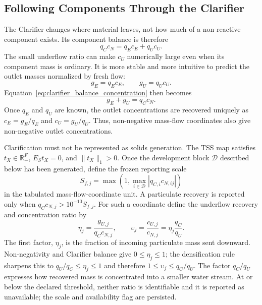 \documentclass[a4paper,fleqn]{cas-sc}
\newcommand{\R}{\mathbb{R}}
\begin{document}
\subsection{Following Components Through the Clarifier}

The Clarifier changes where material leaves, not how much of a non-reactive component exists. Its component balance is therefore
\begin{equation}
\label{eq:clarifier_balance_concentration}
q_Cc_N=q_Ec_E+q_Uc_U.
\end{equation}
The small underflow ratio can make $c_U$ numerically large even when its component mass is ordinary. It is more stable and more intuitive to predict the outlet masses normalized by fresh flow:
\begin{equation}
\label{eq:clarifier_mass_flow_coordinates}
g_E=q_Ec_E,\qquad g_U=q_Uc_U.
\end{equation}
Equation~\eqref{eq:clarifier_balance_concentration} then becomes
\begin{equation}
\label{eq:clarifier_balance}
g_E+g_U=q_Cc_N.
\end{equation}
Once $q_E$ and $q_U$ are known, the outlet concentrations are recovered uniquely as $c_E=g_E/q_E$ and $c_U=g_U/q_U$. Thus, non-negative mass-flow coordinates also give non-negative outlet concentrations.

Clarification must not be represented as solids generation. The TSS map satisfies $t_X\in\R_+^F$, $E_St_X=0$, and $\|t_X\|_1>0$. Once the development block $\mathcal D$ described below has been generated, define the frozen reporting scale
\begin{equation}
S_{f,j}=\max\!\left(1,\max_{i\in\mathcal D}|q_{C,i}c_{N,ij}|\right)
\end{equation}
in the tabulated mass-flow-coordinate unit. A particulate recovery is reported only when $q_Cc_{N,j}>10^{-10}S_{f,j}$. For such a coordinate define the underflow recovery and concentration ratio by
\begin{equation}
\label{eq:component_recovery}
\eta_j=\frac{g_{U,j}}{q_Cc_{N,j}},
\qquad
\upsilon_j=\frac{c_{U,j}}{c_{N,j}}
=\eta_j\frac{q_C}{q_U}.
\end{equation}
The first factor, $\eta_j$, is the fraction of incoming particulate mass sent downward. Non-negativity and Clarifier balance give $0\leq\eta_j\leq1$; the densification rule sharpens this to $q_U/q_C\leq\eta_j\leq1$ and therefore $1\leq\upsilon_j\leq q_C/q_U$. The factor $q_C/q_U$ expresses how recovered mass is concentrated into a smaller water stream. At or below the declared threshold, neither ratio is identifiable and it is reported as unavailable; the scale and availability flag are persisted.
\end{document}
